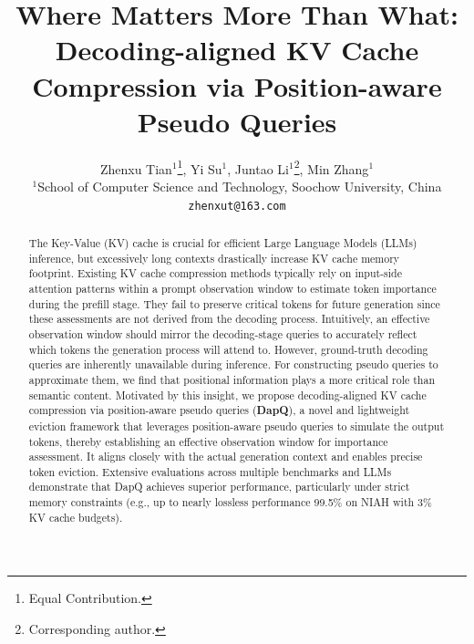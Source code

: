 \documentclass[11pt]{article}
\title{Where Matters More Than What: Decoding-aligned KV Cache Compression via Position-aware Pseudo Queries}
\author{Zhenxu Tian$^{1}$\thanks{\; Equal Contribution.}, Yi Su$^1$\footnotemark[1], Juntao Li$^{1}$\thanks{\; Corresponding author.}, Min Zhang$^{1}$ \\  
 $^{1}$School of Computer Science and Technology, Soochow University, China \\
 \texttt{zhenxut@163.com}
 }
\begin{document}
\maketitle
\begin{abstract}
The Key-Value (KV) cache is crucial for efficient Large Language Models (LLMs) inference, but excessively long contexts drastically increase KV cache memory footprint.
Existing KV cache compression methods typically rely on input-side attention patterns within a prompt observation window to estimate token importance during the prefill stage. They fail to preserve critical tokens for future generation since these assessments are not derived from the decoding process.
Intuitively, an effective observation window should mirror the decoding-stage queries to accurately reflect which tokens the generation process will attend to. However, ground-truth decoding queries are inherently unavailable during inference. For constructing pseudo queries to approximate them, we find that positional information plays a more critical role than semantic content. 
Motivated by this insight, we propose decoding-aligned KV cache compression via position-aware pseudo queries (\textbf{DapQ}), a novel and lightweight eviction framework that leverages position-aware pseudo queries to simulate the output tokens, thereby establishing an effective observation window for importance assessment. It aligns closely with the actual generation context and enables precise token eviction.
Extensive evaluations across multiple benchmarks and LLMs demonstrate that DapQ achieves superior performance, particularly under strict memory constraints (e.g., up to nearly lossless performance 99.5\% on NIAH with 3\% KV cache budgets). 
\end{abstract}








% 
\end{document}
